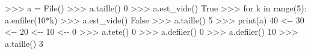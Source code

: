 \documentclass[
  letterpaper,
  DIV=11,
  numbers=noendperiod]{scrartcl}
\newenvironment{Shaded}{\begin{snugshade}}{\end{snugshade}}
\newcommand{\BuiltInTok}[1]{\textcolor[rgb]{0.00,0.23,0.31}{#1}}
\newcommand{\ControlFlowTok}[1]{\textcolor[rgb]{0.00,0.23,0.31}{#1}}
\newcommand{\DecValTok}[1]{\textcolor[rgb]{0.68,0.00,0.00}{#1}}
\newcommand{\KeywordTok}[1]{\textcolor[rgb]{0.00,0.23,0.31}{#1}}
\newcommand{\NormalTok}[1]{\textcolor[rgb]{0.00,0.23,0.31}{#1}}
\newcommand{\OperatorTok}[1]{\textcolor[rgb]{0.37,0.37,0.37}{#1}}
\newcommand{\VariableTok}[1]{\textcolor[rgb]{0.07,0.07,0.07}{#1}}
\begin{document}
\begin{Shaded}
\begin{Highlighting}[]
\OperatorTok{\textgreater{}\textgreater{}\textgreater{}}\NormalTok{ a }\OperatorTok{=}\NormalTok{ File()}
\OperatorTok{\textgreater{}\textgreater{}\textgreater{}}\NormalTok{ a.taille()}
\DecValTok{0}
\OperatorTok{\textgreater{}\textgreater{}\textgreater{}}\NormalTok{ a.est\_vide()}
\VariableTok{True}
\OperatorTok{\textgreater{}\textgreater{}\textgreater{}} \ControlFlowTok{for}\NormalTok{ k }\KeywordTok{in} \BuiltInTok{range}\NormalTok{(}\DecValTok{5}\NormalTok{):}
\NormalTok{        a.enfiler(}\DecValTok{10}\OperatorTok{*}\NormalTok{k)}
\OperatorTok{\textgreater{}\textgreater{}\textgreater{}}\NormalTok{ a.est\_vide()}
\VariableTok{False}
\OperatorTok{\textgreater{}\textgreater{}\textgreater{}}\NormalTok{ a.taille()}
\DecValTok{5}
\OperatorTok{\textgreater{}\textgreater{}\textgreater{}} \BuiltInTok{print}\NormalTok{(a)}
\DecValTok{40} \OperatorTok{\textless{}{-}{-}} \DecValTok{30} \OperatorTok{\textless{}{-}{-}} \DecValTok{20} \OperatorTok{\textless{}{-}{-}} \DecValTok{10} \OperatorTok{\textless{}{-}{-}} \DecValTok{0}
\OperatorTok{\textgreater{}\textgreater{}\textgreater{}}\NormalTok{ a.tete()}
\DecValTok{0}
\OperatorTok{\textgreater{}\textgreater{}\textgreater{}}\NormalTok{ a.defiler()}
\DecValTok{0}
\OperatorTok{\textgreater{}\textgreater{}\textgreater{}}\NormalTok{ a.defiler()}
\DecValTok{10}
\OperatorTok{\textgreater{}\textgreater{}\textgreater{}}\NormalTok{ a.taille()}
\DecValTok{3}
\end{Highlighting}
\end{Shaded}
\end{document}
